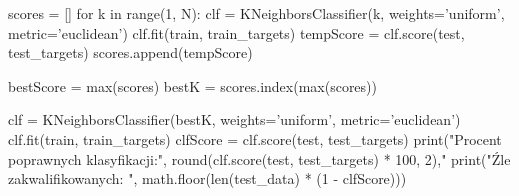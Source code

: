 scores = []
for k in range(1, N):
    clf = KNeighborsClassifier(k, weights='uniform', metric='euclidean')
    clf.fit(train, train_targets)
    tempScore = clf.score(test, test_targets)
    scores.append(tempScore)

bestScore = max(scores)
bestK = scores.index(max(scores))

clf = KNeighborsClassifier(bestK, weights='uniform',
metric='euclidean')
clf.fit(train, train_targets)
clfScore = clf.score(test, test_targets)
print("Procent poprawnych klasyfikacji:", round(clf.score(test, test_targets) * 100, 2),"%
print("Źle zakwalifikowanych: ", math.floor(len(test_data) * (1 - clfScore)))